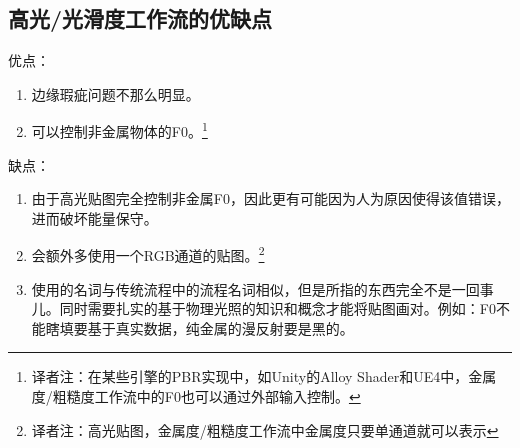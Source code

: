 \subsection{高光/光滑度工作流的优缺点}

优点：

\begin{enumerate}
\item 边缘瑕疵问题不那么明显。
\item 可以控制非金属物体的F0。\footnote{译者注：在某些引擎的PBR实现中，如Unity的Alloy Shader和UE4中，金属度/粗糙度工作流中的F0也可以通过外部输入控制。}
\end{enumerate}

缺点：

\begin{enumerate}
\item 由于高光贴图完全控制非金属F0，因此更有可能因为人为原因使得该值错误，进而破坏能量保守。
\item 会额外多使用一个RGB通道的贴图。\footnote{译者注：高光贴图，金属度/粗糙度工作流中金属度只要单通道就可以表示}
\item 使用的名词与传统流程中的流程名词相似，但是所指的东西完全不是一回事儿。同时需要扎实的基于物理光照的知识和概念才能将贴图画对。例如：F0不能瞎填要基于真实数据，纯金属的漫反射要是黑的。
\end{enumerate}